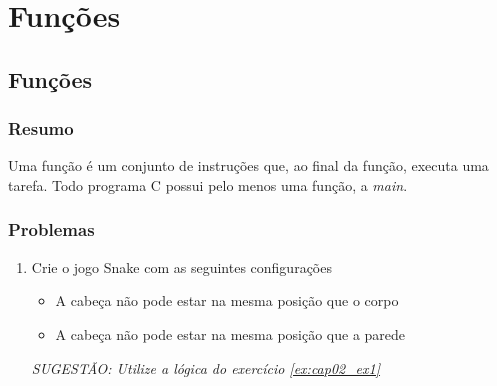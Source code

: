 
\part[Subalgoritmos]
{Funções}


\chapter[Subalgoritmos]
{Funções}



\section*{Resumo}

Uma função é um conjunto de instruções que, ao final da função, executa uma tarefa. Todo programa C possui pelo menos uma função, a \emph{main}.

%
%







\section*{Problemas}
\begin{enumerate}
\item
  Crie o jogo Snake com as seguintes configurações
  \begin{itemize}
  \item
    A cabeça não pode estar na mesma posição que o corpo
  \item
    A cabeça não pode estar na mesma posição que a parede
  \end{itemize}
  \emph{SUGESTÃO: Utilize a lógica do exercício \ref{ex:cap02_ex1} }

  \label{ex:cap03_ex1}
\end{enumerate}

